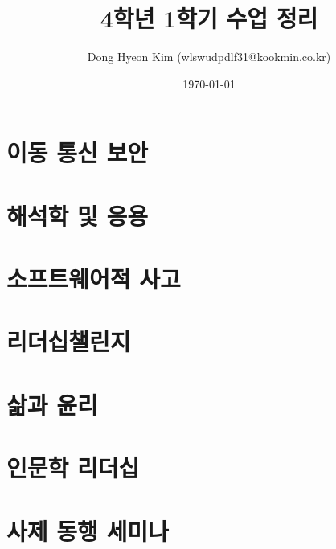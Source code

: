 \documentclass[10pt, a4paper]{report}
\title{4학년 1학기 수업 정리}
\author{Dong Hyeon Kim (wlswudpdlf31@kookmin.co.kr)}
\date{\today}
\begin{document}
\tableofcontents

\chapter{이동 통신 보안}


\chapter{해석학 및 응용}


\chapter{소프트웨어적 사고}


\chapter{리더십챌린지}


\chapter{삶과 윤리}


\chapter{인문학 리더십}


\chapter{사제 동행 세미나}

\end{document}
